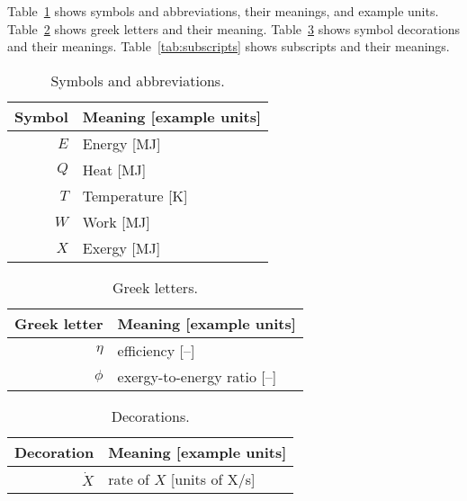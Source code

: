 
Table~\ref{tab:symbols} shows symbols and abbreviations, their meanings, and example units.
Table~\ref{tab:greek} shows greek letters and their meaning.
Table~\ref{tab:decorations} shows symbol decorations and their meanings.
Table~\ref{tab:subscripts} shows subscripts and their meanings.


  
\begin{table}
\centering %
\caption{Symbols and abbreviations.}
\begin{tabular}{r l}
\toprule
Symbol & Meaning [example units] \\
\midrule
$E$ & Energy [MJ] \\
$Q$ & Heat [MJ] \\
$T$ & Temperature [K] \\
$W$ & Work [MJ] \\
$X$ & Exergy [MJ] \\
\bottomrule
\end{tabular}
\label{tab:symbols}
\end{table}



\begin{table}
\centering %
\caption{Greek letters.}
\begin{tabular}{r l}
  \toprule
  Greek letter & Meaning [example units] \\
  \midrule
  $\eta$ & efficiency [--] \\
  $\phi$ & exergy-to-energy ratio [--] \\
  \bottomrule
\end{tabular}
\label{tab:greek}
\end{table}


  
\begin{table}
\centering %
\caption{Decorations.}
\begin{tabular}{r l}
\toprule
Decoration & Meaning [example units] \\
\midrule
$\dot{X}$ & rate of $X$ [units of X/s] \\
\bottomrule
\end{tabular}
\label{tab:decorations}
\end{table}



